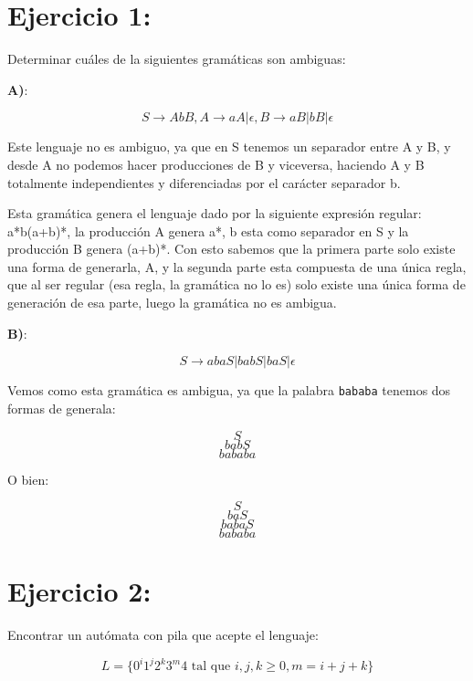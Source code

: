 \documentclass[12pt, spanish]{article}
\begin{document}



\section{Ejercicio 1:} Determinar cuáles de la siguientes gramáticas son ambiguas:

\textbf{A)}: 

$$ S \rightarrow AbB, A \rightarrow aA | \epsilon, B \rightarrow aB | bB | \epsilon  $$

Este lenguaje no es ambiguo, ya que en S tenemos un separador entre A y B, y desde A no podemos hacer producciones de B y viceversa, haciendo A y B totalmente independientes y diferenciadas por el carácter separador b.

Esta gramática genera el lenguaje dado por la siguiente expresión regular: a*b(a+b)*, la producción A genera a*, b esta como separador en S y la producción B genera (a+b)*. Con esto sabemos que la primera parte solo existe una forma de generarla, A, y la segunda parte esta compuesta de una única regla, que al ser regular (esa regla, la gramática no lo es) solo existe una única forma de generación de esa parte, luego la gramática no es ambigua.

\textbf{B)}: 

$$ S \rightarrow abaS | babS | baS | \epsilon $$


Vemos como esta gramática es ambigua, ya que la palabra \texttt{bababa} tenemos dos formas de generala:

$$ S $$
$$ babS $$ 
$$ bababa $$

O bien:

$$ S $$
$$ baS $$ 
$$ babaS $$
$$ bababa $$

\newpage

\section{Ejercicio 2:} Encontrar un autómata con pila que acepte el lenguaje:

$$ L = \{0^i1^j2^k3^m4 \text{ tal que } i, j, k \geq 0, m = i+j+k\}  $$
\end{document}
